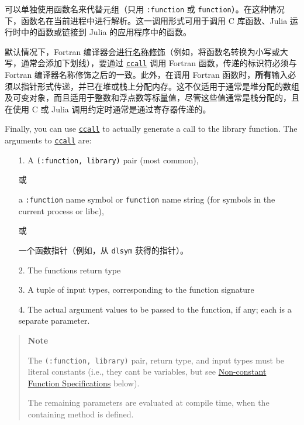 可以单独使用函数名来代替元组（只用 \texttt{:function} 或 \texttt{{\textquotedbl}function{\textquotedbl}}）。在这种情况下，函数名在当前进程中进行解析。这一调用形式可用于调用 C 库函数、Julia 运行时中的函数或链接到 Julia 的应用程序中的函数。



默认情况下，Fortran 编译器会\href{https://en.wikipedia.org/wiki/Name\_mangling\#Fortran}{进行名称修饰}（例如，将函数名转换为小写或大写，通常会添加下划线），要通过 \hyperlink{14245046751182637566}{\texttt{ccall}} 调用 Fortran 函数，传递的标识符必须与 Fortran 编译器名称修饰之后的一致。此外，在调用 Fortran 函数时，\textbf{所有}输入必须以指针形式传递，并已在堆或栈上分配内存。这不仅适用于通常是堆分配的数组及可变对象，而且适用于整数和浮点数等标量值，尽管这些值通常是栈分配的，且在使用 C 或 Julia 调用约定时通常是通过寄存器传递的。



Finally, you can use \hyperlink{14245046751182637566}{\texttt{ccall}} to actually generate a call to the library function. The arguments to \hyperlink{14245046751182637566}{\texttt{ccall}} are:



\begin{itemize}
\item[1. ] A \texttt{(:function, {\textquotedbl}library{\textquotedbl})} pair (most common),

或

a \texttt{:function} name symbol or \texttt{{\textquotedbl}function{\textquotedbl}} name string (for symbols in the current process or libc),

或

一个函数指针（例如，从 \texttt{dlsym} 获得的指针）。


\item[2. ] The function{\textquotesingle}s return type


\item[3. ] A tuple of input types, corresponding to the function signature


\item[4. ] The actual argument values to be passed to the function, if any; each is a separate parameter.

\end{itemize}


\begin{quote}
\textbf{Note}

The \texttt{(:function, {\textquotedbl}library{\textquotedbl})} pair, return type, and input types must be literal constants (i.e., they can{\textquotesingle}t be variables, but see \hyperlink{415091760485310867}{Non-constant Function Specifications} below).

The remaining parameters are evaluated at compile time, when the containing method is defined.

\end{quote}


